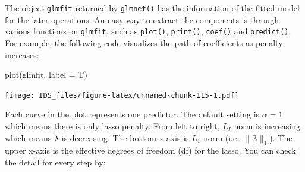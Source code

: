 \documentclass[
  12pt,
]{krantz}
\makeatletter
\newenvironment{Shaded}{\begin{snugshade}}{\end{snugshade}}
\newcommand{\AttributeTok}[1]{\textcolor[rgb]{0.61,0.61,0.61}{#1}}
\newcommand{\CommentTok}[1]{\textcolor[rgb]{0.37,0.37,0.37}{\textit{#1}}}
\newcommand{\DecValTok}[1]{\textcolor[rgb]{0.06,0.06,0.06}{#1}}
\newcommand{\FunctionTok}[1]{\textcolor[rgb]{0,0,0}{#1}}
\newcommand{\NormalTok}[1]{#1}
\newcommand{\OtherTok}[1]{\textcolor[rgb]{0.37,0.37,0.37}{#1}}
\newcommand{\SpecialCharTok}[1]{\textcolor[rgb]{0,0,0}{#1}}
\newcommand{\StringTok}[1]{\textcolor[rgb]{0.5,0.5,0.5}{#1}}
\newenvironment{kframe}{%
\medskip{}
\setlength{\fboxsep}{.8em}
 \def\at@end@of@kframe{}%
 \ifinner\ifhmode%
  \def\at@end@of@kframe{\end{minipage}}%
  \begin{minipage}{\columnwidth}%
 \fi\fi%
 \def\FrameCommand##1{\hskip\@totalleftmargin \hskip-\fboxsep
 \colorbox{shadecolor}{##1}\hskip-\fboxsep
     \hskip-\linewidth \hskip-\@totalleftmargin \hskip\columnwidth}%
 \MakeFramed {\advance\hsize-\width
   \@totalleftmargin\z@ \linewidth\hsize
   \@setminipage}}%
 {\par\unskip\endMakeFramed%
 \at@end@of@kframe}
\renewenvironment{Shaded}{\begin{kframe}}{\end{kframe}}
\makeatother
\begin{document}
\begin{Shaded}
\end{Shaded}

The object \texttt{glmfit} returned by \texttt{glmnet()} has the information of the fitted model for the later operations. An easy way to extract the components is through various functions on \texttt{glmfit}, such as \texttt{plot()}, \texttt{print()}, \texttt{coef()} and \texttt{predict()}. For example, the following code visualizes the path of coefficients as penalty increases:

\begin{Shaded}
\begin{Highlighting}[]
\FunctionTok{plot}\NormalTok{(glmfit, }\AttributeTok{label =}\NormalTok{ T)}
\end{Highlighting}
\end{Shaded}

\texttt{[image: IDS\_files/figure-latex/unnamed-chunk-115-1.pdf]}

Each curve in the plot represents one predictor. The default setting is \(\alpha=1\) which means there is only lasso penalty. From left to right, \(L_I\) norm is increasing which means \(\lambda\) is decreasing. The bottom x-axis is \(L_1\) norm (i.e.~\(\parallel\symbf{\beta}\parallel_{1}\)). The upper x-axis is the effective degrees of freedom (df) for the lasso. You can check the detail for every step by:
\end{document}
